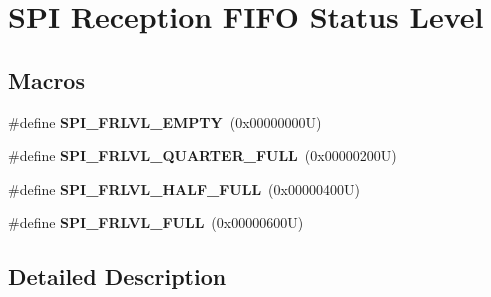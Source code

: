 \hypertarget{group___s_p_i__reception__fifo__status__level}{}\section{S\+PI Reception F\+I\+FO Status Level}
\label{group___s_p_i__reception__fifo__status__level}
\subsection*{Macros}
\begin{DoxyCompactItemize}
\item 
\mbox{\label{group___s_p_i__reception__fifo__status__level_gacff8d3b7b616ec343a64624ee7f0bff7}} 
\#define {\bfseries S\+P\+I\+\_\+\+F\+R\+L\+V\+L\+\_\+\+E\+M\+P\+TY}~(0x00000000\+U)
\item 
\mbox{\label{group___s_p_i__reception__fifo__status__level_ga66988763eea1cfd54424369e43fb18f4}} 
\#define {\bfseries S\+P\+I\+\_\+\+F\+R\+L\+V\+L\+\_\+\+Q\+U\+A\+R\+T\+E\+R\+\_\+\+F\+U\+LL}~(0x00000200\+U)
\item 
\mbox{\label{group___s_p_i__reception__fifo__status__level_ga7aa0da3b1a4379fafa19742219004007}} 
\#define {\bfseries S\+P\+I\+\_\+\+F\+R\+L\+V\+L\+\_\+\+H\+A\+L\+F\+\_\+\+F\+U\+LL}~(0x00000400\+U)
\item 
\mbox{\label{group___s_p_i__reception__fifo__status__level_gaac1ae95d9b33c6f3493aa5e010bb3239}} 
\#define {\bfseries S\+P\+I\+\_\+\+F\+R\+L\+V\+L\+\_\+\+F\+U\+LL}~(0x00000600\+U)
\end{DoxyCompactItemize}


\subsection{Detailed Description}
